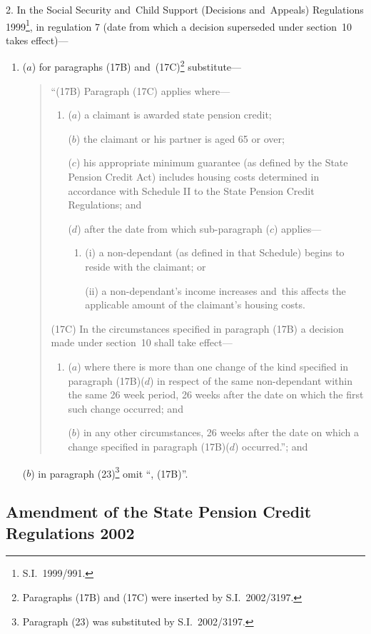 \documentclass[12pt,a4paper]{article}
\begin{document}
2.  In the Social Security and~Child Support (Decisions and~Appeals) Regulations 1999\footnote{S.I.~1999/991.}, in regulation 7 (date from which a decision superseded under section~10 takes effect)—
\begin{enumerate}\item[]
($a$) for paragraphs (17B) and~(17C)\footnote{Paragraphs (17B) and (17C) were inserted by S.I.~2002/3197.} substitute—
\begin{quotation}
“(17B) Paragraph (17C) applies where—
\begin{enumerate}\item[]
($a$) a claimant is awarded state pension credit;

($b$) the claimant or his partner is aged 65 or over;

($c$) his appropriate minimum guarantee (as defined by the State Pension Credit Act) includes housing costs determined in accordance with Schedule II to the State Pension Credit Regulations; and

($d$) after the date from which sub-paragraph ($c$)  applies—
\begin{enumerate}\item[]
(i) a non-dependant (as defined in that Schedule) begins to reside with the claimant; or

(ii) a non-dependant’s income increases and~this affects the applicable amount of the claimant’s housing costs.
\end{enumerate}
\end{enumerate}

(17C) In the circumstances specified in paragraph (17B) a decision made under section~10 shall take effect—
\begin{enumerate}\item[]
($a$) where there is more than one change of the kind specified in paragraph (17B)($d$)  in respect of the same non-dependant within the same 26 week period, 26 weeks after the date on which the first such change occurred; and

($b$) in any other circumstances, 26 weeks after the date on which a change specified in paragraph (17B)($d$)  occurred.”; and
\end{enumerate}
\end{quotation}

($b$) in paragraph (23)\footnote{Paragraph (23) was substituted by S.I.~2002/3197.} omit “, (17B)”.
\end{enumerate}

\subsection[3. Amendment of the State Pension Credit Regulations 2002]{Amendment of the State Pension Credit Regulations 2002}
\end{document}
